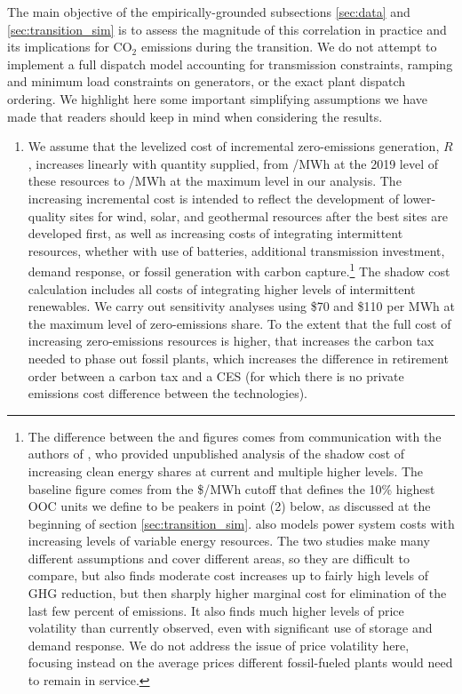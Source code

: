 \documentclass[12pt]{article}
\begin{document}
The main objective of the empirically-grounded subsections \ref{sec:data} and \ref{sec:transition_sim} is to assess the magnitude of this correlation in practice and its implications for CO$_2$ emissions during the transition. We do not attempt to implement a full dispatch model accounting for transmission constraints, ramping and minimum load constraints on generators, or the exact plant dispatch ordering. We highlight here some important simplifying assumptions we have made that readers should keep in mind when considering the results.
\begin{enumerate}
    
    \item We assume that the levelized cost of incremental zero-emissions generation, $R$, increases linearly with quantity supplied, from \unskip/MWh at the 2019 level of these resources to \unskip/MWh at the maximum level in our analysis. The increasing incremental cost is intended to reflect the development of lower-quality sites for wind, solar, and geothermal resources after the best sites are developed first, as well as increasing costs of integrating intermittent resources, whether with use of batteries, additional transmission investment, demand response, or fossil generation with carbon capture.\footnote{The difference between the and figures comes from communication with the authors of \cite{phadke20202035}, who provided unpublished analysis of the shadow cost of increasing clean energy shares at current and multiple higher levels. The baseline figure comes from the \$/MWh cutoff that defines the 10\% highest OOC units we define to be peakers in point (2) below, as discussed at the beginning of section \ref{sec:transition_sim}.  \cite{junge2022properties} also models power system costs with increasing levels of variable energy resources.  The two studies make many different assumptions and cover different areas, so they are difficult to compare, but \cite{junge2022properties} also finds moderate cost increases up to fairly high levels of GHG reduction, but then sharply higher marginal cost for elimination of the last few percent of emissions.  It also finds much higher levels of price volatility than currently observed, even with significant use of storage and demand response. We do not address the issue of price volatility here, focusing instead on the average prices different fossil-fueled plants would need to remain in service.} The shadow cost calculation includes all costs of integrating higher levels of intermittent renewables. We carry out sensitivity analyses using \$70 and \$110 per MWh at the maximum level of zero-emissions share. To the extent that the full cost of increasing zero-emissions resources is higher, that increases the carbon tax needed to phase out fossil plants, which increases the difference in retirement order between a carbon tax and a CES (for which there is no private emissions cost difference between the technologies).
    

\end{enumerate}
\end{document}
